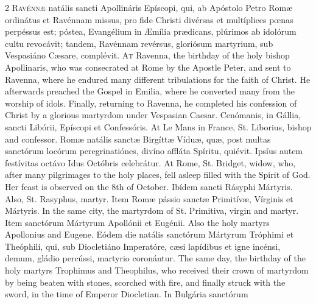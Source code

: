 \begin{paracol}{2}
\lettrine[lines=2]{R}{avénnæ} natális sancti 
 Apollináris Epíscopi, qui, ab Apóstolo Petro Romæ ordinátus et Ravénnam 
 missus, pro fide Christi divérsas et multíplices pœnas perpéssus est; póstea, 
 Evangélium in Æmília prædicans, plúrimos ab idolórum cultu revocávit; 
 tandem, Ravénnam revérsus, gloriósum martyrium, sub Vespasiáno Cæsare, 
 complévit.
\switchcolumn
{}
\lettrine[lines=2]{A}{t} Ravenna, the birthday of the holy 
 bishop Apollinaris, who was consecrated at Rome by the Apostle Peter, and 
 sent to Ravenna, where he endured many different tribulations for the faith 
 of Christ. He afterwards preached the Gospel in Emilia, where he 
 converted many from the worship of idols. Finally, returning to 
 Ravenna, he completed his confession of Christ by a glorious martyrdom under 
 Vespasian Caesar.
\switchcolumn*
{}
Cenómanis, in Gállia, 
 sancti Libórii, Epíscopi et Confessóris.
\switchcolumn
{}
At Le Mans in France, St. Liborius, 
 bishop and confessor.
\switchcolumn*
{}
Romæ natális sanctæ 
 Birgíttæ Víduæ, quæ, post multas sanctórum locórum peregrinatiónes, divíno 
 affláta Spíritu, quiévit. Ipsíus autem festívitas octávo Idus Octóbris 
 celebrátur.
\switchcolumn
{}
At Rome, St. Bridget, widow, who, 
 after many pilgrimages to the holy places, fell asleep filled with the 
 Spirit of God. Her feast is observed on the 8th of October.
\switchcolumn*
{}
Ibídem sancti Rásyphi 
 Mártyris.
\switchcolumn
{}
Also, St. Rasyphus, martyr.
\switchcolumn*
{}
Item Romæ pássio sanctæ 
 Primitívæ, Vírginis et Mártyris.
\switchcolumn
{}
In the same city, the martyrdom of 
 St. Primitiva, virgin and martyr.
\switchcolumn*
{}
Item sanctórum Mártyrum 
 Apollónii et Eugénii.
\switchcolumn
{}
Also the holy martyrs Apollonius and 
 Eugene.
\switchcolumn*
{}
Eódem die natális 
 sanctórum Mártyrum Tróphimi et Theóphili, qui, sub Diocletiáno Imperatóre, 
 cæsi lapídibus et igne incénsi, demum, gládio percússi, martyrio coronántur.
\switchcolumn
{}
The same day, the birthday of the 
 holy martyrs Trophimus and Theophilus, who received their crown of martyrdom 
 by being beaten with stones, scorched with fire, and finally struck with the 
 sword, in the time of Emperor Diocletian.
\switchcolumn*
{}
In Bulgária sanctórum 

\end{paracol}
